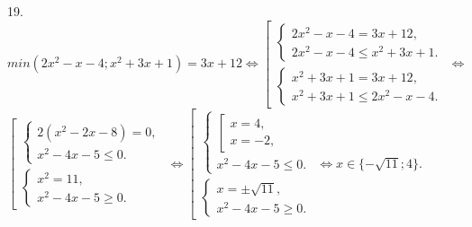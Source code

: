 19. $min(2x^2-x-4; x^2+3x+1)=3x+12\Leftrightarrow\left[\begin{array}{l}\begin{cases}2x^2-x-4=3x+12,\\ 2x^2-x-4\leqslant x^2+3x+1.\end{cases}\\ \begin{cases}x^2+3x+1=3x+12,\\ x^2+3x+1\leqslant 2x^2-x-4.\end{cases}\end{array}\right. \Leftrightarrow$\\$\left[\begin{array}{l}\begin{cases}2(x^2-2x-8)=0,\\ x^2-4x-5\leqslant 0.\end{cases}\\ \begin{cases} x^2=11,\\ x^2-4x-5\geqslant 0.\end{cases}\end{array}\right.\Leftrightarrow\left[\begin{array}{l}\begin{cases}
\left[\begin{array}{l} x=4,\\ x=-2,\end{array}\right.\\ x^2-4x-5\leqslant 0.\end{cases}\\ \begin{cases} x=\pm\sqrt{11},\\ x^2-4x-5\geqslant 0.\end{cases}\end{array}\right.\Leftrightarrow x\in\{-\sqrt{11};4\}.$\\

